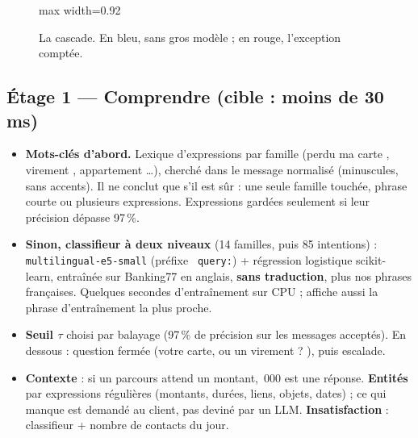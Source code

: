\documentclass[11pt,a4paper]{article}
\DeclareRobustCommand{\f}[1]{{\texttt{\small
  \renewcommand{\_}{\char`\_\allowbreak}#1}}}
\begin{document}
\begin{figure}[tbp]
\begin{adjustbox}{max width=0.92\textwidth}
\end{adjustbox}
\caption{La cascade. En bleu, sans gros modèle ; en rouge, l'exception comptée.}
\end{figure}

\subsection{Étage 1 --- Comprendre (cible : moins de 30 ms)}
\begin{itemize}
  \item \textbf{Mots-clés d'abord.} Lexique d'expressions par famille (\og perdu ma carte \fg,
        \og virement \fg, \og appartement \fg\dots), cherché dans le message normalisé (minuscules,
        sans accents). Il ne conclut que s'il est sûr : une seule famille touchée, phrase courte ou
        plusieurs expressions. Expressions gardées seulement si leur précision dépasse 97\,\%.
  \item \textbf{Sinon, classifieur à deux niveaux} (14 familles, puis 85 intentions) :
        \f{multilingual-e5-small} (préfixe \f{query:}) + régression logistique scikit-learn,
        entraînée sur Banking77 en anglais, \textbf{sans traduction}, plus nos phrases françaises. Quelques secondes
        d'entraînement sur CPU ; affiche aussi la phrase d'entraînement la plus proche.
  \item \textbf{Seuil $\tau$} choisi par balayage (97\,\% de précision sur les messages acceptés).
        En dessous : question fermée (\og votre carte, ou un virement ? \fg), puis escalade.
  \item \textbf{Contexte} : si un parcours attend un montant, \,000 \fg{} est une réponse.
        \textbf{Entités} par expressions régulières (montants, durées, liens, objets, dates) ; ce qui
        manque est demandé au client, pas deviné par un LLM. \textbf{Insatisfaction} :
        classifieur + nombre de contacts du jour.
\end{itemize}
\end{document}
